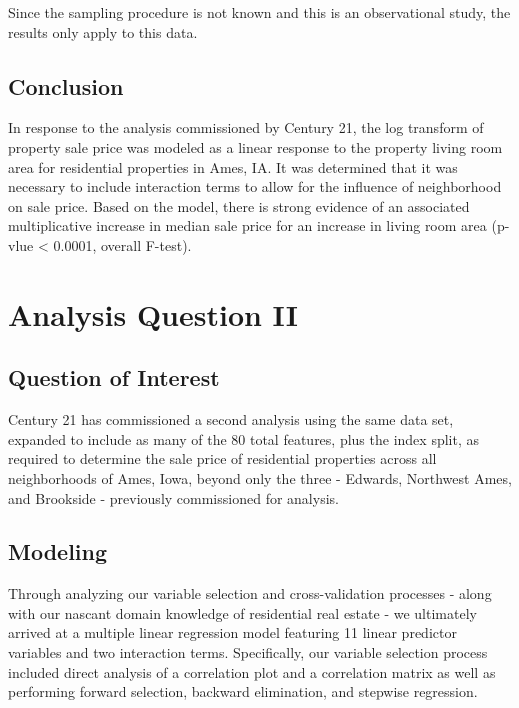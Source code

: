 \documentclass[american,]{article}
\begin{document}
Since the sampling procedure is not known and this is an observational
study, the results only apply to this data.

\hypertarget{conclusion}{%
\subsection{Conclusion}\label{conclusion}}

In response to the analysis commissioned by Century 21, the log
transform of property sale price was modeled as a linear response to the
property living room area for residential properties in Ames, IA. It was
determined that it was necessary to include interaction terms to allow
for the influence of neighborhood on sale price. Based on the model,
there is strong evidence of an associated multiplicative increase in
median sale price for an increase in living room area (p-vlue
\textless{} 0.0001, overall F-test).

\hypertarget{analysis-question-ii}{%
\section{Analysis Question II}\label{analysis-question-ii}}

\hypertarget{question-of-interest-1}{%
\subsection{Question of Interest}\label{question-of-interest-1}}

Century 21 has commissioned a second analysis using the same data set,
expanded to include as many of the 80 total features, plus the index
split, as required to determine the sale price of residential properties
across all neighborhoods of Ames, Iowa, beyond only the three - Edwards,
Northwest Ames, and Brookside - previously commissioned for analysis.

\hypertarget{modeling-1}{%
\subsection{Modeling}\label{modeling-1}}

Through analyzing our variable selection and cross-validation processes
- along with our nascant domain knowledge of residential real estate -
we ultimately arrived at a multiple linear regression model featuring 11
linear predictor variables and two interaction terms. Specifically, our
variable selection process included direct analysis of a correlation
plot and a correlation matrix as well as performing forward selection,
backward elimination, and stepwise regression.
\end{document}
